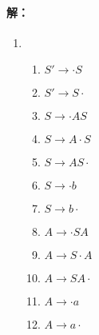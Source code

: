 \paragraph{解：}
\begin{enumerate}
	\item 
	\begin{enumerate}
		\item $S' \to \cdot S$
		\item $S' \to S \cdot$
		\item $S \to \cdot AS$
		\item $S \to A \cdot S$
		\item $S \to AS \cdot$
		\item $S \to \cdot b$
		\item $S \to b \cdot$
		\item $A \to \cdot SA$
		\item $A \to S \cdot A$
		\item $A \to SA \cdot$
		\item $A \to \cdot a$
		\item $A \to a \cdot$	
	\end{enumerate}


\end{enumerate}
